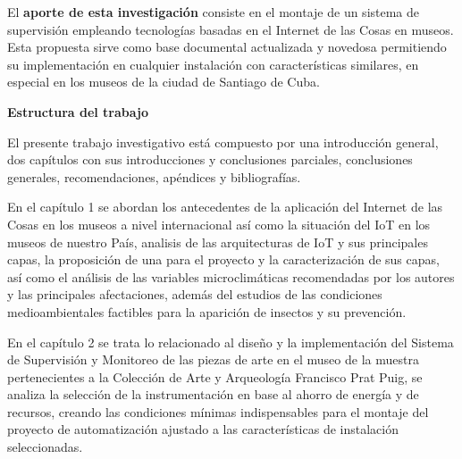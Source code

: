    El \textbf{aporte de esta investigación} consiste en el montaje de un sistema de supervisión empleando tecnologías basadas en el Internet de las Cosas en museos. Esta propuesta sirve como base documental actualizada y novedosa permitiendo su implementación en cualquier instalación con características similares, en especial en los museos de la ciudad de Santiago de Cuba.

    \textbf{Estructura del trabajo}

    El presente trabajo investigativo está compuesto por una introducción general, dos capítulos con sus introducciones y conclusiones parciales, conclusiones generales, recomendaciones, apéndices y bibliografías.

    En el capítulo 1 se abordan los antecedentes de la aplicación del Internet de las Cosas en los museos a nivel internacional así como la situación del IoT en los museos de nuestro País, analisis de las arquitecturas de IoT y sus principales capas, la proposición de una para el proyecto y la caracterización de sus capas, así como el análisis de las variables microclimáticas recomendadas por los autores y las principales afectaciones, además del estudios de las condiciones medioambientales factibles para la aparición de insectos y su prevención.

    En el capítulo 2 se trata lo relacionado al diseño y la implementación del Sistema de Supervisión y Monitoreo de las piezas de arte en el museo de la muestra pertenecientes a la Colección de Arte y Arqueología Francisco Prat Puig, se analiza la selección de la instrumentación en base al ahorro de energía y de recursos, creando las condiciones mínimas indispensables para el montaje del proyecto de automatización ajustado a las características de instalación seleccionadas.
    